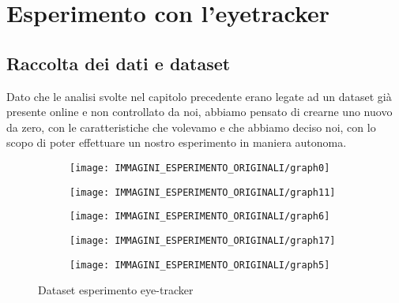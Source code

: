\documentclass[%
	corpo=12pt,
    twoside,
    stile=classica,
    oldstyle,
    tipotesi=custom,
    greek,
    evenboxes,
]{toptesi}
\begin{document}
{\chapter{Esperimento con l'eyetracker}

\section{Raccolta dei dati e dataset}
Dato che le analisi svolte nel capitolo precedente erano legate ad un dataset già presente online e non controllato da noi, abbiamo pensato di crearne uno nuovo da zero, con le caratteristiche che volevamo e che abbiamo deciso noi, con lo scopo di  poter effettuare un nostro esperimento in maniera autonoma.

\begin{figure}[!htb]\centering
\begin{subfigure}
\centering
\texttt{[image: IMMAGINI\_ESPERIMENTO\_ORIGINALI/graph0]}
\end{subfigure}
\begin{subfigure}
\centering
\texttt{[image: IMMAGINI\_ESPERIMENTO\_ORIGINALI/graph11]}
\end{subfigure}
\begin{subfigure}
\centering
\texttt{[image: IMMAGINI\_ESPERIMENTO\_ORIGINALI/graph6]}
\end{subfigure}
\begin{subfigure}
\centering
\texttt{[image: IMMAGINI\_ESPERIMENTO\_ORIGINALI/graph17]}
\end{subfigure}
\begin{subfigure}
\centering
\texttt{[image: IMMAGINI\_ESPERIMENTO\_ORIGINALI/graph5]}
\end{subfigure}
\caption{Dataset esperimento eye-tracker}\label{fig: graphs}
\end{figure}

}
\end{document}
